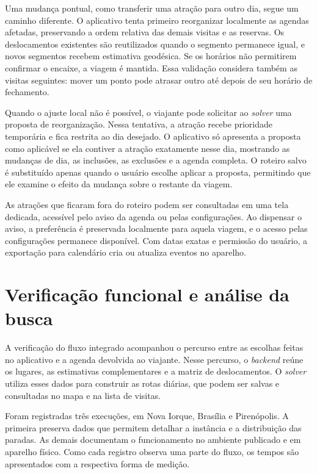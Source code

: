 Uma mudança pontual, como transferir uma atração para outro dia, segue um caminho diferente. O aplicativo tenta primeiro reorganizar localmente as agendas afetadas, preservando a ordem relativa das demais visitas e as reservas. Os deslocamentos existentes são reutilizados quando o segmento permanece igual, e novos segmentos recebem estimativa geodésica. Se os horários não permitirem confirmar o encaixe, a viagem é mantida. Essa validação considera também as visitas seguintes: mover um ponto pode atrasar outro até depois de seu horário de fechamento.

Quando o ajuste local não é possível, o viajante pode solicitar ao \textit{solver} uma proposta de reorganização. Nessa tentativa, a atração recebe prioridade temporária e fica restrita ao dia desejado. O aplicativo só apresenta a proposta como aplicável se ela contiver a atração exatamente nesse dia, mostrando as mudanças de dia, as inclusões, as exclusões e a agenda completa. O roteiro salvo é substituído apenas quando o usuário escolhe aplicar a proposta, permitindo que ele examine o efeito da mudança sobre o restante da viagem.

As atrações que ficaram fora do roteiro podem ser consultadas em uma tela dedicada, acessível pelo aviso da agenda ou pelas configurações. Ao dispensar o aviso, a preferência é preservada localmente para aquela viagem, e o acesso pelas configurações permanece disponível. Com datas exatas e permissão do usuário, a exportação para calendário cria ou atualiza eventos no aparelho.



\section{Verificação funcional e análise da busca}
\label{sec:resultados}

A verificação do fluxo integrado acompanhou o percurso entre as escolhas feitas no aplicativo e a agenda devolvida ao viajante. Nesse percurso, o \textit{backend} reúne os lugares, as estimativas complementares e a matriz de deslocamentos. O \textit{solver} utiliza esses dados para construir as rotas diárias, que podem ser salvas e consultadas no mapa e na lista de visitas.

Foram registradas três execuções, em Nova Iorque, Brasília e Pirenópolis. A primeira preserva dados que permitem detalhar a instância e a distribuição das paradas. As demais documentam o funcionamento no ambiente publicado e em aparelho físico. Como cada registro observa uma parte do fluxo, os tempos são apresentados com a respectiva forma de medição.

